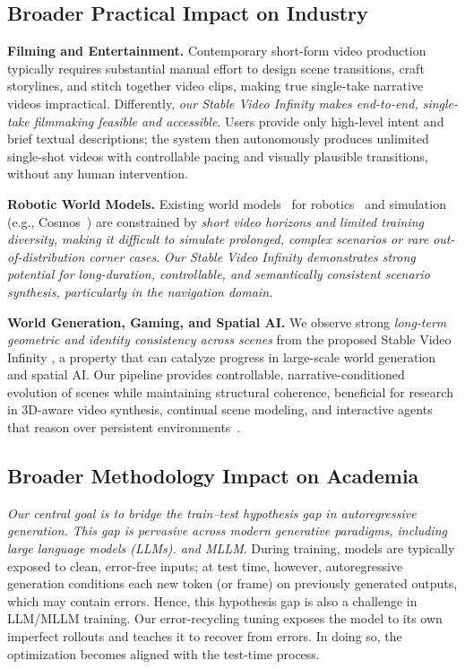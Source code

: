 \documentclass{article} %
\newcommand{\method}{Stable Video Infinity }
\begin{document}
\subsection{Broader Practical Impact on Industry}

\textbf{Filming and Entertainment.} Contemporary short-form video production typically requires substantial manual effort to design scene transitions, craft storylines, and stitch together video clips, making true single-take narrative videos impractical. Differently, \emph{our \method makes end-to-end, single-take filmmaking feasible and accessible}. Users provide only high-level intent and brief textual descriptions; the system then autonomously produces unlimited single-shot videos with controllable pacing and visually plausible transitions, without any human intervention.

\textbf{Robotic World Models.} Existing world models~\citep{wang2023world} for robotics~\citep{li2025voxdet} and simulation (e.g., Cosmos~\citep{agarwal2025cosmos}) are constrained by \emph{short video horizons and limited training diversity, making it difficult to simulate prolonged, complex scenarios or rare out-of-distribution corner cases}. \emph{Our \method demonstrates strong potential for long-duration, controllable, and semantically consistent scenario synthesis, particularly in the navigation domain.} 


\textbf{World Generation, Gaming, and Spatial AI.} We observe strong \emph{long-term geometric and identity consistency across scenes} from the proposed \method, a property that can catalyze progress in large-scale world generation and spatial AI. Our pipeline provides controllable, narrative-conditioned evolution of scenes while maintaining structural coherence, beneficial for research in 3D-aware video synthesis, continual scene modeling, and interactive agents that reason over persistent environments~\citep{che2024gamegen,yu2025gamefactory,generalworldmodelsurvey}. 


\subsection{Broader Methodology Impact on Academia}

\emph{Our central goal is to bridge the train–test hypothesis gap in autoregressive generation. This gap is pervasive across modern generative paradigms, including large language models (LLMs). and MLLM}. During training, models are typically exposed to clean, error-free inputs; at test time, however, autoregressive generation conditions each new token (or frame) on previously generated outputs, which may contain errors. Hence, this hypothesis gap is also a challenge in LLM/MLLM training. Our error-recycling tuning exposes the model to its own imperfect rollouts and teaches it to recover from errors. In doing so, the optimization becomes aligned with the test-time process.
\end{document}

